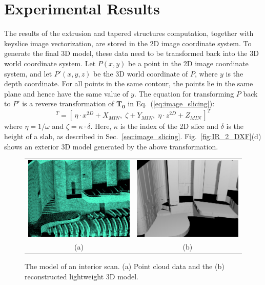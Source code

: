 \documentclass[review]{acmsiggraph}       %
\newcommand{\Eq}[1] {Eq.~(\ref{eq:#1})}
\newcommand{\Sec}[1]{Sec.~\ref{sec:#1}}
\newcommand{\Figd}[1]{Fig.~\ref{fig:#1}(d)}
\begin{document}
\section{Experimental Results}
\label{sec:IR_OUT}

The results of the extrusion and tapered structures computation,
together with keyslice image vectorization, are stored in the 2D
image coordinate system. To generate the final 3D model, these
data need to be transformed back into the 3D world coordinate system.
Let $P(x,y)$ be a point in the 2D image coordinate system, and let $P'(x,y,z)$
be the 3D world coordinate of $P$, where $y$ is the depth coordinate.
For all points in the same contour, the points lie in the same plane and
hence have the same value of $y$.
The equation for transforming $P$ back to $P'$ is a reverse transformation
of $\boldsymbol{T_0}$ in \Eq{image_slicing}:
\begin{equation}
[\,x^{3D},\; y^{3D},\; z^{3D}\,]^T = [\,\eta\cdot x^{2D} + X_{MIN},\; \zeta + Y_{MIN},\; \eta\cdot z^{2D} + Z_{MIN}\,]^T
\label{eq:ir2dxf}
\end{equation}
where $\eta=1/\omega$ and $\zeta=\kappa\cdot\delta$. Here, $\kappa$ is the
index of the 2D slice and $\delta$ is the height of a slab, as described
in \Sec{image_slicing}.
\Figd{IR_2_DXF} shows an exterior 3D model generated by the above
transformation.

\begin{figure}[htbp]
\begin{center}
\begin{tabular}{cc}
\includegraphics[width=2.5in]{range_crop.png} &
\includegraphics[width=2.5in]{HunterTheatreShaded.jpg} \\
(a) & (b)
\end{tabular}
\end{center}
\caption{The model of an interior scan. (a) Point cloud data and the
(b) reconstructed lightweight 3D model.}
\label{fig:IN}
\end{figure}
\end{document}
